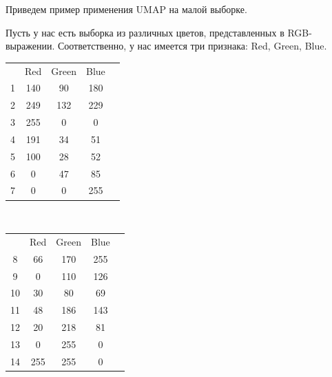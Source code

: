 \graphicspath{{colors/}}

Приведем пример применения UMAP на малой выборке.

Пусть у нас есть выборка из различных цветов, представленных в RGB-выражении. Соответственно, у нас имеется три признака: Red, Green, Blue.
\setlength{\extrarowheight}{2mm}
\begin{center}
\begin{multicols}{2}
	\begin{tabular}{c|c|c|cp{15mm}}
		& Red & Green & Blue & \\
		\cline{1-4}
		1 & 140 & 90 & 180 & \cellcolor[RGB]{140, 90, 180}\\
		\cline{1-4}
		2 & 249 & 132 & 229 & \cellcolor[RGB]{249, 132, 229}\\
		\cline{1-4}
		3 & 255 & 0 & 0 & \cellcolor[RGB]{255, 0, 0}\\
		\cline{1-4}
		4 & 191 & 34 & 51 & \cellcolor[RGB]{191, 34, 51}\\
		\cline{1-4}
		5 & 100 & 28 & 52 & \cellcolor[RGB]{100, 28, 52}\\
		\cline{1-4}
		6 & 0 & 47 & 85 & \cellcolor[RGB]{0, 47, 85}\\
		\cline{1-4}
		7 & 0 & 0 & 255 & \cellcolor[RGB]{0, 0, 255}\\
	\end{tabular}\\
	\begin{tabular}{c|c|c|cp{15mm}}
		& Red & Green & Blue & \\
		\cline{1-4}
		8 & 66 & 170 & 255 & \cellcolor[RGB]{66, 170, 255}\\
		\cline{1-4}
		9 & 0 & 110 & 126 & \cellcolor[RGB]{0, 110, 126}\\
		\cline{1-4}
		10 & 30 & 80 & 69 & \cellcolor[RGB]{30, 80, 69} \\
		\cline{1-4}
		11 & 48 & 186 & 143 & \cellcolor[RGB]{48, 186, 143}\\
		\cline{1-4}
		12 & 20 & 218 & 81 & \cellcolor[RGB]{20, 218, 81}\\
		\cline{1-4}
		13 & 0 & 255 & 0 & \cellcolor[RGB]{0, 255, 0}\\
		\cline{1-4}
		14 & 255 & 255 & 0 & \cellcolor[RGB]{255, 255, 0}\\
	\end{tabular}
\end{multicols}
\end{center}

